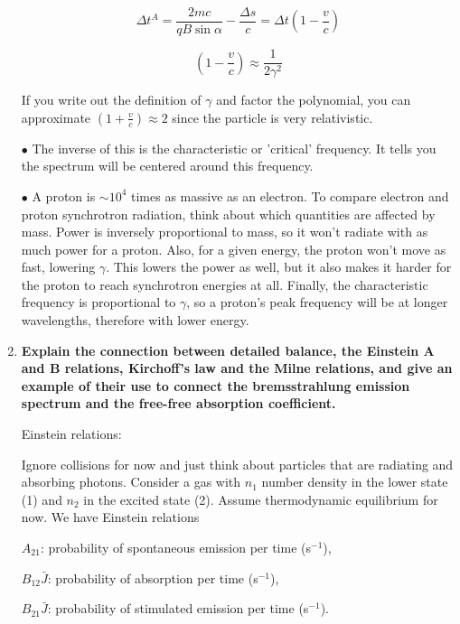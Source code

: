 \begin{enumerate}
       \begin{equation}
      \Delta t^{A} = \frac{2mc}{qB\sin{\alpha}} - \frac{\Delta s}{c} = \Delta t (1 - \frac{v}{c})
      \end{equation}
      
      \begin{equation}
      (1 - \frac{v}{c}) \approx \frac{1}{2\gamma^{2}}
      \end{equation}
      
      If you write out the definition of $\gamma$ and factor the polynomial, you can approximate $(1 + \frac{v}{c}) \approx 2$ since the particle is very relativistic.
      
      $\bullet$ The inverse of this is the characteristic or 'critical' frequency. It tells you the spectrum will be centered around this frequency.
      
      $\bullet$ A proton is $\sim10^{4}$ times as massive as an electron. To compare electron and proton synchrotron radiation, think about which quantities are affected by mass. Power is inversely proportional to mass, so it won't radiate with as much power for a proton. Also, for a given energy, the proton won't move as fast, lowering $\gamma$. This lowers the power as well, but it also makes it harder for the proton to reach synchrotron energies at all. Finally, the characteristic frequency is proportional to $\gamma$, so a proton's peak frequency will be at longer wavelengths, therefore with lower energy.
      
\item \textbf{Explain the connection between detailed balance, the Einstein A and B relations,
      Kirchoff's law and the Milne relations, and give an example of their use to connect the
      bremsstrahlung emission spectrum and the free-free absorption coefficient.}
      
      Einstein relations:
      
      Ignore collisions for now and just think about particles that are radiating and absorbing photons. Consider a gas with $n_1$ number density in the lower state (1) and $n_2$ in the excited state (2). Assume thermodynamic equilibrium for now. We have Einstein relations
      
      $A_{21}$: probability of spontaneous emission per time (s$^{-1}$),
      
      $B_{12}\bar{J}$: probability of absorption per time (s$^{-1}$),
      
       $B_{21}\bar{J}$: probability of stimulated emission per time (s$^{-1}$).
       

\end{enumerate}
